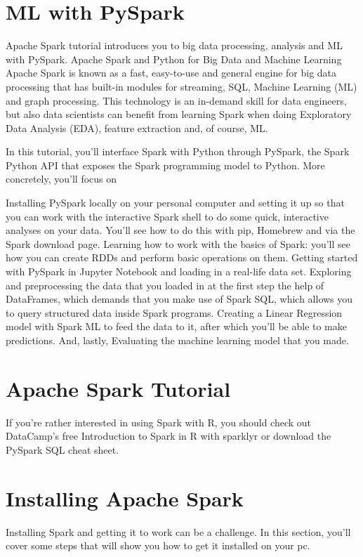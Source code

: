 \documentclass[a4paper,12pt]{article}
\begin{document}
\section*{ML with PySpark}


Apache Spark tutorial introduces you to big data processing, analysis and ML with PySpark.
Apache Spark and Python for Big Data and Machine Learning
Apache Spark is known as a fast, easy-to-use and general engine for big data processing that has built-in modules for streaming, SQL, Machine Learning (ML) and graph processing. This technology is an in-demand skill for data engineers, but also data scientists can benefit from learning Spark when doing Exploratory Data Analysis (EDA), feature extraction and, of course, ML.

In this tutorial, you’ll interface Spark with Python through PySpark, the Spark Python API that exposes the Spark programming model to Python. More concretely, you’ll focus on

Installing PySpark locally on your personal computer and setting it up so that you can work with the interactive Spark shell to do some quick, interactive analyses on your data. You’ll see how to do this with pip, Homebrew and via the Spark download page.
Learning how to work with the basics of Spark: you’ll see how you can create RDDs and perform basic operations on them.
Getting started with PySpark in Jupyter Notebook and loading in a real-life data set.
Exploring and preprocessing the data that you loaded in at the first step the help of DataFrames, which demands that you make use of Spark SQL, which allows you to query structured data inside Spark programs.
Creating a Linear Regression model with Spark ML to feed the data to it, after which you’ll be able to make predictions. And, lastly,
Evaluating the machine learning model that you made.

\section*{Apache Spark Tutorial}


If you're rather interested in using Spark with R, you should check out DataCamp’s free Introduction to Spark in R with sparklyr or download the PySpark SQL cheat sheet.

\section*{Installing Apache Spark}
Installing Spark and getting it to work can be a challenge. In this section, you’ll cover some steps that will show you how to get it installed on your pc.
\end{document}
